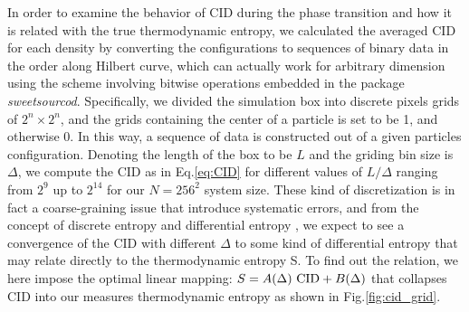 \documentclass[a4paper]{article}
\begin{document}
In order to examine the behavior of CID during the phase transition and how it is related with the true thermodynamic entropy, we calculated the averaged CID for each density by converting the configurations to sequences of binary data in the order along Hilbert curve, which can actually work for arbitrary dimension using the scheme involving bitwise operations embedded in the package \textit{sweetsourcod}. Specifically, we divided the simulation box into discrete pixels grids of $2^n \times 2^n$, and the grids containing the center of a particle is set to be 1, and otherwise 0. In this way, a sequence of data is constructed out of a given particles configuration. Denoting the length of the box to be $L$ and the griding bin size is $\Delta$, we compute the CID as in Eq.\ref{eq:CID} for different values of $L/\Delta$ ranging from $2^9$ up to $2^{14}$ for our $N=256^2$ system size. These kind of discretization is in fact a coarse-graining issue that introduce systematic errors, and from the concept of discrete entropy and differential entropy \cite{Cover:2006:EIT:1146355}, we expect to see a convergence of the CID with different $\Delta$ to some kind of differential entropy that may relate directly to the thermodynamic entropy S. To find out the relation, we here impose the optimal linear mapping: $S = A(\Delta)~ {\rm CID} + B(\Delta)$ that collapses CID into our measures thermodynamic entropy as shown in Fig.\ref{fig:cid_grid}.
\end{document}
